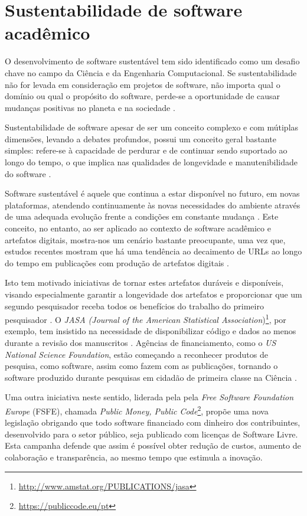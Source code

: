 \section{Sustentabilidade de software acadêmico}
\label{sec:sustentabilidade}

O desenvolvimento de software sustentável tem sido identificado como um desafio
chave no campo da Ciência e da Engenharia Computacional.
Se sustentabilidade
não for levada em consideração em projetos de software, não importa qual o
domínio ou qual o propósito do software, perde-se a oportunidade de causar
mudanças positivas no planeta e na sociedade \cite{becker2014karlskrona}.

Sustentabilidade de software apesar de ser um conceito complexo e com mútiplas dimensões,
levando a debates profundos, possui um conceito geral bastante simples: refere-se à
capacidade de perdurar e de continuar sendo suportado ao longo do tempo, o que 
implica nas qualidades de longevidade e manutenibilidade do software
\cite{venters2014software}.

Software sustentável é aquele que continua a estar disponível no futuro, em
novas plataformas, atendendo continuamente às novas necessidades do ambiente
através de uma adequada evolução frente a condições em constante mudança
\cite{allen2017engineering}. Este conceito, no entanto, ao ser aplicado ao
contexto de software acadêmico e artefatos digitais, mostra-nos um cenário
bastante preocupante, uma vez que, estudos recentes mostram que há uma tendência
ao decaimento de URLs ao longo do tempo em publicações com produção de
artefatos digitais \cite{wren2017use}.

Isto tem motivado iniciativas de tornar estes artefatos duráveis e disponíveis,
visando especialmente garantir a longevidade dos artefatos e proporcionar que
um segundo pesquisador receba todos os benefícios do trabalho do primeiro
pesquisador \cite{king1995replication}.
O {\it JASA (Journal of the American Statistical Association})\footnote{\url{http://www.amstat.org/PUBLICATIONS/jasa}}, por
exemplo, tem insistido na necessidade de disponibilizar código e dados ao
menos durante a revisão dos manuscritos \cite{baker2016scientists}.
Agências de financiamento, como o {\it US National Science Foundation}, estão começando a
reconhecer produtos de pesquisa, como software, assim como fazem com as
publicações, tornando o software produzido durante pesquisas em cidadão de primeira
classe na Ciência \cite{allen2017engineering}.

Uma outra iniciativa neste sentido, liderada pela pela {\it Free Software
Foundation Europe} (FSFE), chamada {\it Public Money, Public
Code}\footnote{\url{https://publiccode.eu/pt}}, propõe uma nova legislação
obrigando que todo software financiado com dinheiro dos contribuintes,
desenvolvido para o setor público, seja publicado com licenças de Software
Livre. Esta campanha defende que assim é possível obter redução de custos,
aumento de colaboração e transparência, ao mesmo tempo que estimula a inovação.

